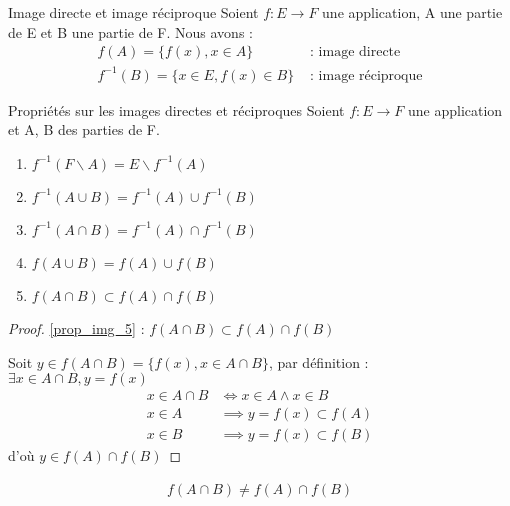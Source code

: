 \begin{definition}{Image directe et image réciproque}
	Soient $f:E \to F$ une application, A une partie de E et B une partie de F. Nous avons :
	\begin{align*}
		f(A) = \{f(x), x \in A\} &\text{ : image directe} \\
		f^{-1}(B) = \{x \in E, f(x) \in B\} &\text{ : image réciproque}
	\end{align*}
\end{definition}
\clearpage
\begin{proposition}{Propriétés sur les images directes et réciproques}
	Soient $f:E \to F$ une application et A, B des parties de F.
	\begin{enumerate}
		\item \label{prop_img_1} $f^{-1}(F \backslash A) = E \backslash f^{-1}(A)$
		\item \label{prop_img_2} $f^{-1}(A \cup B) = f^{-1}(A) \cup f^{-1}(B)$
		\item \label{prop_img_3} $f^{-1}(A \cap B) = f^{-1}(A) \cap f^{-1}(B)$
		\item \label{prop_img_4} $f(A \cup B) = f(A) \cup f(B)$
		\item \label{prop_img_5} $f(A \cap B) \subset f(A) \cap f(B)$
	\end{enumerate}
\end{proposition}

\begin{proof}
	\ref{prop_img_5} : $f(A \cap B) \subset f(A) \cap f(B)$ \\
	\par \noindent Soit $y \in f(A \cap B) = \{f(x), x \in A \cap B\}$, par définition : $\exists x \in A \cap B, y = f(x)$
	\begin{align*}
		x \in A \cap B &\iff x \in A \wedge x \in B \\
		x \in A &\implies y = f(x) \subset f(A) \\
		x \in B &\implies y = f(x) \subset f(B) 
	\end{align*}
	d'où $y \in f(A) \cap f(B)$
\end{proof} 

\begin{remarque}
	\begin{align*}
		f(A \cap B) \neq f(A) \cap f(B)
	\end{align*}
\end{remarque}
